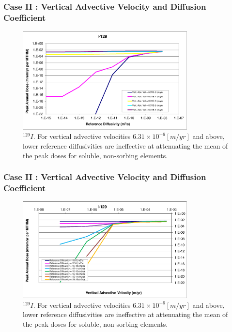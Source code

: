 \begin{frame}[c]
  \frametitle{Case II : Vertical Advective Velocity and Diffusion Coefficient}
\begin{figure}[htp!]
\centering
\includegraphics[width=0.8\textwidth]{AdvVelAndDiffCoeffEBSFail/I-129.eps}
\caption{$^{129}I$. For vertical advective velocities 
$6.31\times10^{-6}[m/yr]$ and above, lower reference diffusivities are 
ineffective at attenuating the mean of the peak doses for soluble, non-sorbing 
elements. 
}
\label{fig:VAdvVelI129}
\end{figure}
\end{frame}

\begin{frame}[c]
  \frametitle{Case II : Vertical Advective Velocity and Diffusion Coefficient}

\begin{figure}[ht!]
\centering
\includegraphics[width=0.8\textwidth]{AdvVelAndDiffCoeffEBSFail/I-129-VAdvVel.eps}
\caption{$^{129}I$.
For vertical advective velocities 
$6.31\times10^{-6}[m/yr]$ and above, lower reference diffusivities are 
ineffective at attenuating the mean of the peak doses for soluble, non-sorbing 
elements. 
}
\label{fig:VAdvVelI129VAdvVel}
\end{figure}
\end{frame}

